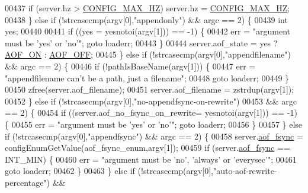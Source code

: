 \begin{DoxyCode}
{{00437             \textcolor{keywordflow}{if} (server.hz > \hyperlink{server_8h_a39e5c16e64adef2e14a9d66a725b91fd}{CONFIG\_MAX\_HZ}) server.hz = 
      \hyperlink{server_8h_a39e5c16e64adef2e14a9d66a725b91fd}{CONFIG\_MAX\_HZ};
00438         \} \textcolor{keywordflow}{else} \textcolor{keywordflow}{if} (!strcasecmp(argv[0],\textcolor{stringliteral}{"appendonly"}) && argc == 2) \{
00439             \textcolor{keywordtype}{int} yes;
00440 
00441             \textcolor{keywordflow}{if} ((yes = yesnotoi(argv[1])) == -1) \{
00442                 err = \textcolor{stringliteral}{"argument must be 'yes' or 'no'"}; \textcolor{keywordflow}{goto} loaderr;
00443             \}
00444             server.aof\_state = yes ? \hyperlink{server_8h_af6b151c9dced28e94c19479197113a83}{AOF\_ON} : \hyperlink{server_8h_a5226306fbcebcb6d5d02e0fef3c213c2}{AOF\_OFF};
00445         \} \textcolor{keywordflow}{else} \textcolor{keywordflow}{if} (!strcasecmp(argv[0],\textcolor{stringliteral}{"appendfilename"}) && argc == 2) \{
00446             \textcolor{keywordflow}{if} (!pathIsBaseName(argv[1])) \{
00447                 err = \textcolor{stringliteral}{"appendfilename can't be a path, just a filename"};
00448                 \textcolor{keywordflow}{goto} loaderr;
00449             \}
00450             zfree(server.aof\_filename);
00451             server.aof\_filename = zstrdup(argv[1]);
00452         \} \textcolor{keywordflow}{else} \textcolor{keywordflow}{if} (!strcasecmp(argv[0],\textcolor{stringliteral}{"no-appendfsync-on-rewrite"})
00453                    && argc == 2) \{
00454             \textcolor{keywordflow}{if} ((server.aof\_no\_fsync\_on\_rewrite= yesnotoi(argv[1])) == -1) \{
00455                 err = \textcolor{stringliteral}{"argument must be 'yes' or 'no'"}; \textcolor{keywordflow}{goto} loaderr;
00456             \}
00457         \} \textcolor{keywordflow}{else} \textcolor{keywordflow}{if} (!strcasecmp(argv[0],\textcolor{stringliteral}{"appendfsync"}) && argc == 2) \{
00458             server.\hyperlink{config_8h_af5994c643c434574580bb7816af82cad}{aof\_fsync} = configEnumGetValue(aof\_fsync\_enum,argv[1]);
00459             \textcolor{keywordflow}{if} (server.\hyperlink{config_8h_af5994c643c434574580bb7816af82cad}{aof\_fsync} == INT\_MIN) \{
00460                 err = \textcolor{stringliteral}{"argument must be 'no', 'always' or 'everysec'"};
00461                 \textcolor{keywordflow}{goto} loaderr;
00462             \}
00463         \} \textcolor{keywordflow}{else} \textcolor{keywordflow}{if} (!strcasecmp(argv[0],\textcolor{stringliteral}{"auto-aof-rewrite-percentage"}) &&
}}
\end{DoxyCode}

